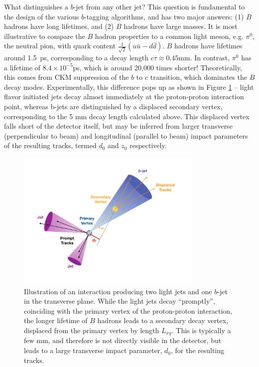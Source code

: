 What distinguishes a $b$-jet from any other jet? This question is fundamental to the design of the various $b$-tagging 
algorithms, and has two major answers: (1) $B$ hadrons have long lifetimes, and (2) $B$ hadrons have large masses. 
It is most illustrative to compare the $B$ hadron properties to a common light meson, e.g. $\pi^{0}$, the neutral 
pion, with quark content $\frac{1}{\sqrt{2}}(u\bar{u}-d\bar{d})$. $B$ hadrons have lifetimes around \SI{1.5}{\ps},
corresponding to a decay length $c\tau\approx 0.45$mm. In contrast, $\pi^0$ has a lifetime of $8.4\times 10^{-5}$ps, 
which is around 20,000 times shorter! Theoretically, this comes from CKM suppression of the $b$ to $c$ transition, which dominates the $B$ decay modes. Experimentally, this difference pops up as shown in 
Figure \ref{fig:bjet-diagram} -- light flavor initiated jets decay almost immediately at the proton-proton 
interaction point, whereas b-jets are distinguished by a displaced secondary vertex, corresponding to the 5 mm decay 
length calculated above. This displaced vertex falls short of the detector itself, but may be inferred from larger 
transverse (perpendicular to beam) and longitudinal (parallel to beam) impact parameters of the resulting tracks, 
termed $d_{0}$ and $z_{0}$ respectively.

\begin{figure}[ht]
\centering
\includegraphics[width=0.8\textwidth]{figures/bjet-diagram.pdf}
\caption{\label{fig:bjet-diagram} Illustration of an interaction producing two light jets and one $b$-jet 
in the transverse plane. While the light jets decay ``promptly'', coinciding with the primary vertex of the 
proton-proton interaction, the longer lifetime of $B$ hadrons leads to a secondary decay vertex, displaced from 
the primary vertex by length $L_{xy}$. This is typically a few mm, and therefore is not directly visible in the 
detector, but leads to a large transverse impact parameter, $d_{0}$, for the resulting tracks.~\cite{bjettrigger}}
\end{figure}

